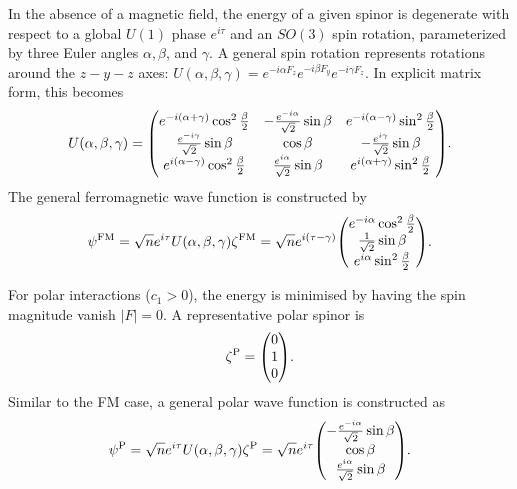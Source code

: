 In the absence of a magnetic field, the energy of a given spinor is degenerate
with respect to a global \(U(1)\) phase \(e^{i\tau}\) and an \(SO(3)\) spin
rotation, parameterized by three Euler angles \(\alpha, \beta \),
and \(\gamma \).
A general spin rotation represents rotations around the \(z-y-z\) axes:
\(U(\alpha, \beta, \gamma) = e^{-i\alpha F_z}e^{-i\beta F_y}e^{-i\gamma F_z}\).
In explicit matrix form, this becomes
\begin{equation}
    U(\alpha, \beta, \gamma) = \mqty(
    e^{-i(\alpha + \gamma)}\cos^2\frac{\beta}{2} &
    -\frac{e^{-i\alpha}}{\sqrt{2}}\sin\beta &
    e^{-i(\alpha - \gamma)}\sin^2\frac{\beta}{2} \\
    \frac{e^{-i\gamma}}{\sqrt{2}}\sin\beta &
    \cos\beta &
    -\frac{e^{i\gamma}}{\sqrt{2}}\sin\beta \\
    e^{i(\alpha - \gamma)}\cos^2\frac{\beta}{2} &
    \frac{e^{i\alpha}}{\sqrt{2}}\sin\beta &
    e^{i(\alpha + \gamma)}\sin^2\frac{\beta}{2}
    ).
\end{equation}
The general ferromagnetic wave function is constructed by
\begin{equation}\label{eq: FM-representative-spinor}
    \psi^\mathrm{FM} =
    \sqrt{n}e^{i\tau}U(\alpha, \beta, \gamma)\zeta^\mathrm{FM} =
    \sqrt{n}e^{i(\tau - \gamma)}\mqty(
    e^{-i\alpha}\cos^2\frac{\beta}{2} \\
    \frac{1}{\sqrt{2}}\sin\beta \\
    e^{i\alpha}\sin^2\frac{\beta}{2}
    ).
\end{equation}

For polar interactions (\(c_1 > 0\)), the energy is minimised by having the
spin magnitude vanish \(|F|=0\).
A representative polar spinor is
\begin{equation}\label{eq: EAP-spinor}
    \zeta^\mathrm{P} = \mqty(0 \\ 1 \\ 0).
\end{equation}
Similar to the FM case, a general polar wave function is constructed as
\begin{equation}\label{eq: polar-representative-spinor}
    \psi^\mathrm{P} =
    \sqrt{n}e^{i\tau}U(\alpha, \beta, \gamma)\zeta^\mathrm{P} =
    \sqrt{n}e^{i\tau}\mqty(
    -\frac{e^{-i\alpha}}{\sqrt{2}}\sin\beta \\
    \cos\beta \\
    \frac{e^{i\alpha}}{\sqrt{2}}\sin\beta
    ).
\end{equation}

